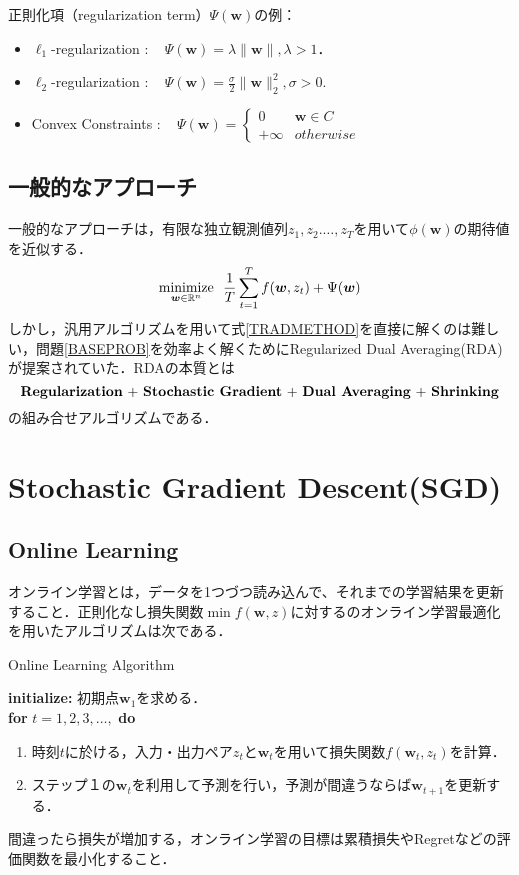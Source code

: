 \documentclass[a4paper,11pt]{jsarticle}
\numberwithin{theorem}{section}  %
\numberwithin{equation}{section} %
\newcommand{\minimize}{\mathop{\mathrm{\rm minimize}}\limits}
\begin{document}
正則化項（regularization term）$\Psi(\bm{w})$の例：
\begin{itemize}
\item $\ell_1$-regularization : \,\,\, $\Psi(\bm{w})=\lambda\|\bm{w}\|, \lambda > 1$．
\item $\ell_2$-regularization : \,\,\, $\Psi(\bm{w})=\frac{\sigma}{2}\|\bm{w}\|_2^2,\sigma >0$.
\item Convex Constraints : \,\,\, $\Psi(\bm{w})=\begin{cases}
0 & \bm{w} \in C　\\
+ \infty & otherwise
\end{cases}$
\end{itemize}


\subsection{一般的なアプローチ}
一般的なアプローチは，有限な独立観測値列$z_1,z_2.\dots,z_T$を用いて$\phi(\bm{w})$の期待値を近似する．
\begin{equation}
\minimize_{\bm{w}\in\mathbb{R}^n} \,\,\, \frac{1}{T} \sum_{t=1}^T f(\bm{w},z_t) + \Psi(\bm{w})
\label{TRADMETHOD}
\end{equation}
しかし，汎用アルゴリズムを用いて式\eqref{TRADMETHOD}を直接に解くのは難しい，問題\eqref{BASEPROB}を効率よく解くためにRegularized Dual Averaging(RDA)が提案されていた．RDAの本質とは
\[\text{\textbf{Regularization} + \textbf{Stochastic Gradient} + \textbf{Dual Averaging} + \textbf{Shrinking}}\]
の組み合せアルゴリズムである．

\section{Stochastic Gradient Descent(SGD)}
\subsection{Online Learning}
オンライン学習とは，データを1つづつ読み込んで、それまでの学習結果を更新すること．正則化なし損失関数$\min f(\bm{w},z)$に対するのオンライン学習最適化を用いたアルゴリズムは次である．
\begin{algorithm}[H]
\caption{Online Learning Algorithm}
\label{OLA}
\textbf{initialize:} 初期点$\bm{w}_1$を求める．\\
\textbf{for} $t=1,2,3,\dots,$ \textbf{do}
\begin{enumerate}
\item 時刻$t$に於ける，入力・出力ペア$z_t$と$\bm{w}_t$を用いて損失関数$f(\bm{w}_t,z_t)$を計算．
\item ステップ１の$\bm{w}_t$を利用して予測を行い，予測が間違うならば$\bm{w}_{t+1}$を更新する．
\end{enumerate}
\end{algorithm}
間違ったら損失が増加する，オンライン学習の目標は累積損失やRegretなどの評価関数を最小化すること．
\end{document}
